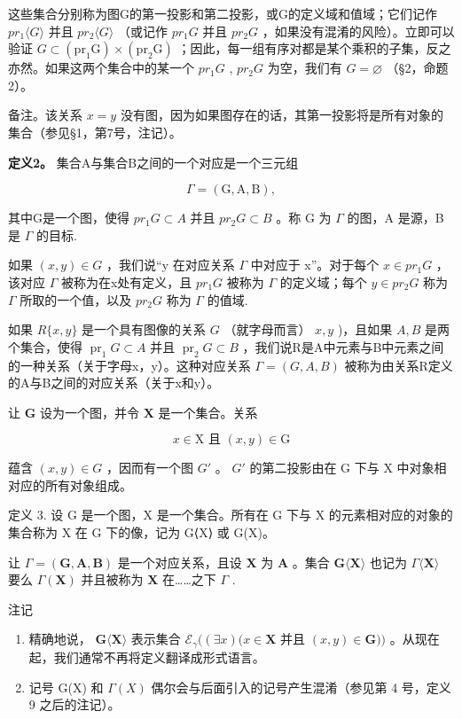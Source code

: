这些集合分别称为图G的第一投影和第二投影，或G的定义域和值域；它们记作 \(pr_{1}\langle G\rangle\) 并且 \(pr_{2}\langle G\rangle\) （或记作 \(pr_{1}G\) 并且 \(pr_{2}G\) ，如果没有混淆的风险）。立即可以验证 \(G\subset(\mathrm{pr}_{1}\mathrm{G})\times(\mathrm{pr}_{2}\mathrm{G})\) ；因此，每一组有序对都是某个乘积的子集，反之亦然。如果这两个集合中的某一个 \(pr_{1}G\) , \(pr_{2}G\) 为空，我们有 \(G=\varnothing\) （§2，命题2）。

备注。该关系 \(x = y\) 没有图，因为如果图存在的话，其第一投影将是所有对象的集合（参见§1，第7号，注记）。

\textbf{定义2。} 集合A与集合B之间的一个对应是一个三元组

\[
\Gamma = (\mathrm{G}, \mathrm{A}, \mathrm{B}),
\]

其中G是一个图，使得 \(pr_{1}G \subset A\) 并且 \(pr_{2}G \subset B\) 。称 G 为 \(\Gamma\) 的图，A 是源，B 是 \(\Gamma\) 的目标.

如果 \((x, y) \in G\) ，我们说“y 在对应关系 \(\Gamma\) 中对应于 x”。对于每个 \(x \in pr_{1}G\) ，该对应 \(\Gamma\) 被称为在x处有定义，且 \(pr_{1}G\) 被称为 \(\Gamma\) 的定义域；每个 \(y \in pr_{2}G\) 称为 \(\Gamma\) 所取的一个值，以及 \(pr_{2}G\) 称为 \(\Gamma\) 的值域.

如果 \(R\{x, y\}\) 是一个具有图像的关系 \(G\) （就字母而言） \(x, y\) )，且如果 \(A, B\) 是两个集合，使得 \(\operatorname{pr}_1 G \subset A\) 并且 \(\operatorname{pr}_2 G \subset B\) ，我们说R是A中元素与B中元素之间的一种关系（关于字母x，y）。这种对应关系 \(\Gamma = (G, A, B)\) 被称为由关系R定义的A与B之间的对应关系（关于x和y）。

让 \(\mathbf{G}\) 设为一个图，并令 \(\mathbf{X}\) 是一个集合。关系

\[
x \in \mathrm{X} \text {   且   } (x, y) \in \mathrm{G}
\]

蕴含 \((x, y) \in G\) ，因而有一个图 \(G'\) 。 \(G'\) 的第二投影由在 G 下与 X 中对象相对应的所有对象组成。

定义 3. 设 G 是一个图，X 是一个集合。所有在 G 下与 X 的元素相对应的对象的集合称为 X 在 G 下的像，记为 G⟨X⟩ 或 G(X)。

让 \(\Gamma = (\mathbf{G},\mathbf{A},\mathbf{B})\) 是一个对应关系，且设 \(\mathbf{X}\) 为 \(\mathbf{A}\) 。集合 \(\mathbf{G}\langle \mathbf{X}\rangle\) 也记为 \(\Gamma \langle \mathbf{X}\rangle\) 要么 \(\Gamma (\mathbf{X})\) 并且被称为 \(\mathbf{X}\) 在……之下 \(\Gamma\) .

注记

\begin{enumerate}
\def\labelenumi{(\arabic{enumi})}
\item
  精确地说， \(\mathbf{G}\langle \mathbf{X}\rangle\) 表示集合 \(\mathcal{E}_{\gamma}((\exists x)(x\in \mathbf{X}\) 并且 \((x,y)\in \mathbf{G}))\) 。从现在起，我们通常不再将定义翻译成形式语言。
\item
  记号 G(X) 和 \(\Gamma(X)\) 偶尔会与后面引入的记号产生混淆（参见第 4 号，定义 9 之后的注记）。
\end{enumerate}

